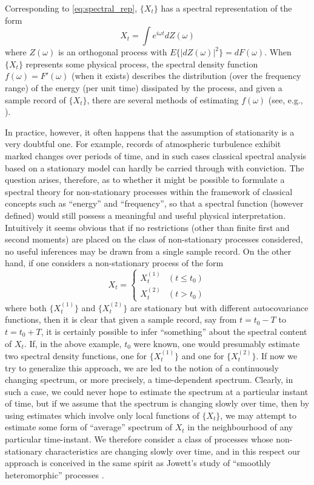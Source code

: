 \documentclass{article}
\begin{document}
Corresponding to \eqref{eq:spectral_rep}, $\{X_t \}$ has a spectral
representation of the form
\begin{equation}
  \label{eq:process_rep} X_t = \int e^{i \omega t} dZ (\omega)
\end{equation}
where $Z (\omega)$ is an orthogonal process with $E \{|dZ (\omega) |^2 \} = dF
(\omega)$. When $\{X_t \}$ represents some physical process, the spectral
density function $f (\omega) = F' (\omega)$ (when it exists) describes the
distribution (over the frequency range) of the energy (per unit time)
dissipated by the process, and given a sample record of $\{X_t \}$, there are
several methods of estimating $f (\omega)$ (see, e.g.,
{\cite{grenander1957}}).

In practice, however, it often happens that the assumption of stationarity is
a very doubtful one. For example, records of atmospheric turbulence exhibit
marked changes over periods of time, and in such cases classical spectral
analysis based on a stationary model can hardly be carried through with
conviction. The question arises, therefore, as to whether it might be possible
to formulate a spectral theory for non-stationary processes within the
framework of classical concepts such as ``energy'' and ``frequency'', so that
a spectral function (however defined) would still possess a meaningful and
useful physical interpretation. Intuitively it seems obvious that if no
restrictions (other than finite first and second moments) are placed on the
class of non-stationary processes considered, no useful inferences may be
drawn from a single sample record. On the other hand, if one considers a
non-stationary process of the form
\begin{equation}
  \label{eq:piecewise_stat} X_t = \left\{\begin{array}{ll}
    X_t^{(1)} & (t \leqslant t_0)\\
    X_t^{(2)} & (t > t_0)
  \end{array}\right.
\end{equation}
where both $\{X_t^{(1)} \}$ and $\{X_t^{(2)} \}$ are stationary but with
different autocovariance functions, then it is clear that given a sample
record, say from $t = t_0 - T$ to $t = t_0 + T$, it is certainly possible to
infer ``something'' about the spectral content of $X_t$. If, in the above
example, $t_0$ were known, one would presumably estimate two spectral density
functions, one for $\{X_t^{(1)} \}$ and one for $\{X_t^{(2)} \}$. If now we
try to generalize this approach, we are led to the notion of a continuously
changing spectrum, or more precisely, a time-dependent spectrum. Clearly, in
such a case, we could never hope to estimate the spectrum at a particular
instant of time, but if we assume that the spectrum is changing slowly over
time, then by using estimates which involve only local functions of $\{X_t
\}$, we may attempt to estimate some form of ``average'' spectrum of $X_t$ in
the neighbourhood of any particular time-instant. We therefore consider a
class of processes whose non-stationary characteristics are changing slowly
over time, and in this respect our approach is conceived in the same spirit as
Jowett's study of ``smoothly heteromorphic'' processes {\cite{jowett1957}}.
\end{document}
